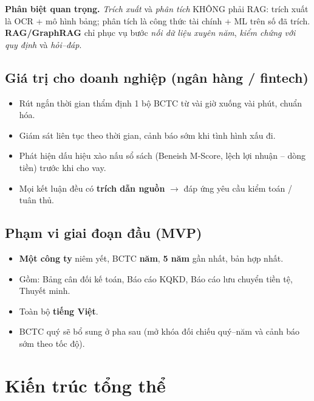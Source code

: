 \documentclass[11pt,a4paper]{article}
\begin{document}
\begin{ghichu}
\textbf{Phân biệt quan trọng.} \emph{Trích xuất} và \emph{phân tích} KHÔNG phải RAG: trích xuất là OCR + mô hình bảng; phân tích là công thức tài chính + ML trên số đã trích. \textbf{RAG/GraphRAG} chỉ phục vụ bước \emph{nối dữ liệu xuyên năm}, \emph{kiểm chứng với quy định} và \emph{hỏi--đáp}.
\end{ghichu}

\subsection{Giá trị cho doanh nghiệp (ngân hàng / fintech)}
\begin{itemize}
  \item Rút ngắn thời gian thẩm định 1 bộ BCTC từ vài giờ xuống vài phút, chuẩn hóa.
  \item Giám sát liên tục theo thời gian, cảnh báo sớm khi tình hình xấu đi.
  \item Phát hiện dấu hiệu xào nấu sổ sách (Beneish M-Score, lệch lợi nhuận -- dòng tiền) trước khi cho vay.
  \item Mọi kết luận đều có \textbf{trích dẫn nguồn} $\rightarrow$ đáp ứng yêu cầu kiểm toán / tuân thủ.
\end{itemize}

\subsection{Phạm vi giai đoạn đầu (MVP)}
\begin{itemize}
  \item \textbf{Một công ty} niêm yết, BCTC \textbf{năm}, \textbf{5 năm} gần nhất, bản hợp nhất.
  \item Gồm: Bảng cân đối kế toán, Báo cáo KQKD, Báo cáo lưu chuyển tiền tệ, Thuyết minh.
  \item Toàn bộ \textbf{tiếng Việt}.
  \item BCTC quý sẽ bổ sung ở pha sau (mở khóa đối chiếu quý--năm và cảnh báo sớm theo tốc độ).
\end{itemize}

\section{Kiến trúc tổng thể}
\end{document}
